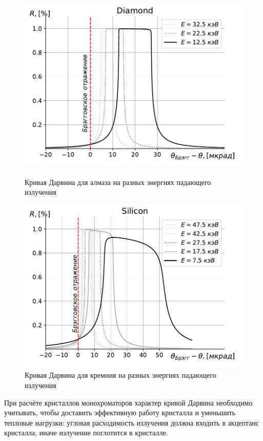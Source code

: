 \begin{figure}
	\centering  
	\begin{minipage}{0.49\textwidth}
		\centering
		\includegraphics[width=\textwidth]{pic/Diamond_bragg_R.pdf}
		\caption{Кривая Дарвина для алмаза на разных энергиях падающего излучения}
		\label{fig:bragg_R}
	\end{minipage}\hfill
	\begin{minipage}{0.49\textwidth}
		\centering
		\includegraphics[width=\textwidth]{pic/Silicon_bragg_R.pdf}
		\caption{Кривая Дарвина для кремния на разных энергиях падающего излучения}
		\label{fig:bragg_T}
	\end{minipage}    
\end{figure}
При расчёте кристаллов монохроматоров характер кривой Дарвина необходимо учитывать, чтобы доставить эффективную работу кристалла и уменьшить тепловые нагрузки: угловая расходимость излучения должна входить в акцептанс кристалла, иначе излучение поглотится в кристалле. 

